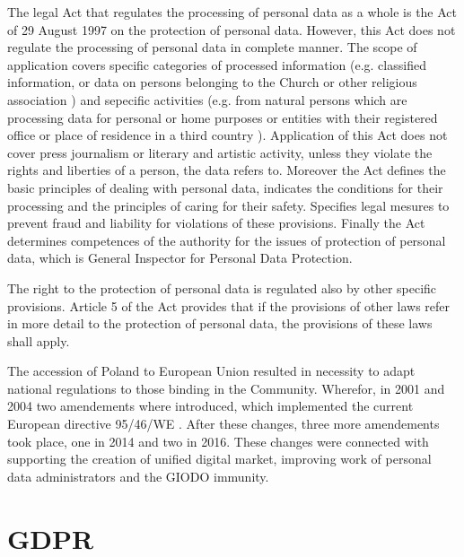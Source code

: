 \documentclass[en, noamssymb]{mgr}
\begin{document}
\indent The legal Act that regulates the processing of personal data as a whole is the Act of 29 August 1997 on the protection of personal data. However, this Act does not regulate the processing of personal data in complete manner. The scope of application covers specific categories of processed information (e.g. classified information, or data on persons belonging to the Church or other religious association \cite{prawo_odo}) and sepecific activities (e.g. from natural persons which are processing data for personal or home purposes or entities with their registered office or place of  residence in a third country \cite{prawo_odo}). Application of this Act does not cover press journalism or literary and artistic activity, unless they violate the rights and liberties of a person, the data refers to. Moreover the Act defines the basic principles of dealing with personal data, indicates the conditions for their processing and the principles of caring for their safety. Specifies legal mesures to prevent fraud and liability for violations of these provisions. Finally the Act determines competences of the authority for the issues of protection of personal data, which is General Inspector for Personal Data Protection.

\indent The right to the protection of personal data is regulated also by other specific provisions. Article 5 of the Act provides that if the provisions of other laws refer in more detail to the protection of personal data, the provisions of these laws shall apply.

\indent The accession of Poland to European Union resulted in necessity to adapt national regulations to those binding in the Community. Wherefor, in 2001 and 2004 two amendements where introduced, which implemented the current European directive 95/46/WE \cite{prawo_odo}. After these changes, three more amendements took place, one in 2014 and two in 2016. These changes were connected with supporting the creation of unified digital market, improving work of personal data administrators and the GIODO immunity.


\chapter{GDPR} \label{sec:sekcjaRODO}
\end{document}
